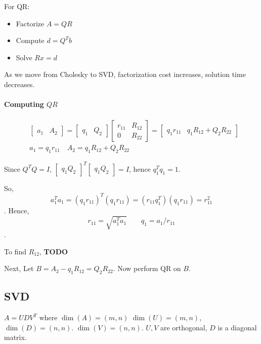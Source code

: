 \documentclass[11pt]{book}
\DeclareMathOperator{\shape}{dim}
\begin{document}
For QR:
\begin{itemize}
    \item Factorize $A = QR$
    \item Compute $d = Q^Tb$
    \item Solve $Rx = d$
\end{itemize}


As we move from Cholesky to SVD, factorization cost increases, solution
time decreases.

\paragraph{Computing $QR$}
\begin{align*}
    &\begin{bmatrix}
        a_1 & A_2
    \end{bmatrix} = 
    \begin{bmatrix}
        q_1 & Q_2
    \end{bmatrix} 
    \begin{bmatrix}
        r_{11} & R_{12} \\ 0 & R_{22}
    \end{bmatrix} =  
    \begin{bmatrix}
        q_1 r_{11}  & q_1 R_{12} + Q_2 R_{22}
    \end{bmatrix} 
    \\
    &a_1 = q_1 r_{11} \quad A_2 = q_1 R_{12} + Q_2 R_{22}
\end{align*}

Since $Q^TQ = I$, $\begin{bmatrix}q_1 Q_2\end{bmatrix}^T \begin{bmatrix} q_1 Q_2\end{bmatrix} = I$,
hence $q_1^T q_1 = 1$.

So, \[a_1^Ta_1 = (q_1 r_{11})^T (q_1 r_{11}) = (r_{11} q_1^T) (q_1 r_{11}) = r_{11}^2\].
Hence, \[r_{11} = \sqrt{a_1^T a_1} \qquad q_1 = a_1 / r_{11}\].

To find $R_{12}$, \textbf{TODO}

Next, Let $B = A_2 - q_1 R_{12} = Q_2 R_{22}$. Now perform QR on $B$.

\subsection{SVD}
$A = UDV^T$ where $\shape(A) = (m, n)$ $\shape(U) = (m, n)$, $\shape(D) =  (n, n)$.
$\dim(V) = (n, n)$.  $U, V$ are orthogonal, $D$ is a diagonal matrix.
\end{document}
